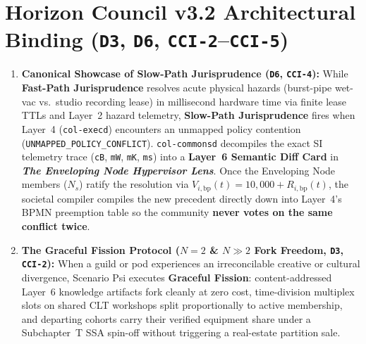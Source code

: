 \section{Horizon Council v3.2 Architectural Binding (\texttt{D3}, \texttt{D6}, \texttt{CCI-2}--\texttt{CCI-5})}
\begin{enumerate}
    \item \textbf{Canonical Showcase of Slow-Path Jurisprudence (\texttt{D6}, \texttt{CCI-4}):} While \textbf{Fast-Path Jurisprudence} resolves acute physical hazards (burst-pipe wet-vac vs.\ studio recording lease) in millisecond hardware time via finite lease TTLs and Layer~2 hazard telemetry, \textbf{Slow-Path Jurisprudence} fires when Layer~4 (\texttt{col-execd}) encounters an unmapped policy contention (\texttt{UNMAPPED\_POLICY\_CONFLICT}). \texttt{col-commonsd} decompiles the exact SI telemetry trace (\texttt{cB}, \texttt{mW}, \texttt{mK}, \texttt{ms}) into a \textbf{Layer~6 Semantic Diff Card} in \textbf{\textit{The Enveloping Node Hypervisor Lens}}. Once the Enveloping Node members ($N_s$) ratify the resolution via $V_{i,\mathrm{bp}}(t) = 10{,}000 + R_{i,\mathrm{bp}}(t)$, the societal compiler compiles the new precedent directly down into Layer~4's BPMN preemption table so the community \textbf{never votes on the same conflict twice}.
    \item \textbf{The Graceful Fission Protocol ($N=2$ \& $N \gg 2$ Fork Freedom, \texttt{D3}, \texttt{CCI-2}):} When a guild or pod experiences an irreconcilable creative or cultural divergence, Scenario Psi executes \textbf{Graceful Fission}: content-addressed Layer~6 knowledge artifacts fork cleanly at zero cost, time-division multiplex slots on shared CLT workshops split proportionally to active membership, and departing cohorts carry their verified equipment share under a Subchapter~T SSA spin-off without triggering a real-estate partition sale.
\end{enumerate}

